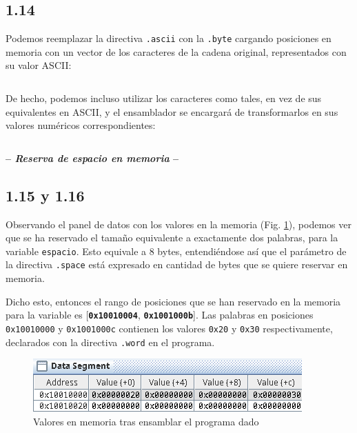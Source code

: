 \documentclass[a4paper]{report}
\begin{document}
\subsection*{1.14}

Podemos reemplazar la directiva \texttt{.ascii} con la \texttt{.byte} cargando posiciones en memoria con un vector de los caracteres de la cadena original, representados con su valor ASCII:

\vspace{7pt}
\inputminted[linenos]{mips}{src/cuestiones/c1-14.asm}
\vspace{7pt}

De hecho, podemos incluso utilizar los caracteres como tales, en vez de sus equivalentes en ASCII, y el ensamblador se encargará de transformarlos en sus valores numéricos correspondientes:

\vspace{7pt}
\inputminted[linenos]{mips}{src/cuestiones/c1-14b.asm}
\vspace{7pt}

\begin{center}
\large\textbf{-- \textsl{Reserva de espacio en memoria} --}
\end{center}

\subsection*{1.15 y 1.16}

Observando el panel de datos con los valores en la memoria (Fig. \ref{fig:space-mem}), podemos ver que se ha reservado el tamaño equivalente a exactamente dos palabras, para la variable \texttt{espacio}. Esto equivale a 8 bytes, entendiéndose así que el parámetro de la directiva \texttt{.space} está expresado en cantidad de bytes que se quiere reservar en memoria.

Dicho esto, entonces el rango de posiciones que se han reservado en la memoria para la variable es [\texttt{\textbf{0x10010004}}, \texttt{\textbf{0x1001000b}}]. Las palabras en posiciones \texttt{0x10010000} y \texttt{0x1001000c} contienen los valores \texttt{0x20} y \texttt{0x30} respectivamente, declarados con la directiva \texttt{.word} en el programa.

\begin{figure}[H]
    \centering
    \captionsetup{justification = centering}
    \includegraphics[width=.6\linewidth]{img/c1-15}
    \caption{Valores en memoria tras ensamblar el programa dado}
    \label{fig:space-mem}
\end{figure}
\end{document}
